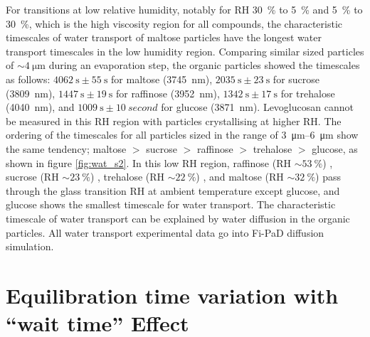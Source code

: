 For transitions at low relative humidity, notably for RH \SI{30}{\percent} to \SI{5}{\percent} and \SI{5}{\percent} to \SI{30}{\percent}, which is the high viscosity region for all compounds, the characteristic timescales of water transport of maltose particles have the longest water transport timescales in the low humidity region. Comparing similar sized particles of $\sim \SI{4}{\micro\meter}$ during an evaporation step, the organic particles showed the timescales as follows: $\SI{4062}{\second} \pm \SI{55}{\second}$ for maltose (\SI{3745}{\nano\meter}), $\SI{2035}{\second} \pm \SI{23}{\second}$ for sucrose (\SI{3809}{\nano\meter}), $\SI{1447}{\second} \pm \SI{19}{\second}$ for raffinose (\SI{3952}{\nano\meter}), $\SI{1342}{\second} \pm \SI{17}{\second}$ for trehalose (\SI{4040}{\nano\meter}), and $\SI{1009}{\second} \pm \SI{10}{second}$ for glucose (\SI{3871}{\nano\meter}). Levoglucosan cannot be measured in this RH region with particles crystallising at higher RH. The ordering of the timescales for all particles sized in the range of \SIrange[range-phrase=\text{--}]{3}{6}{\micro\meter} show the same tendency; maltose $>$ sucrose $>$ raffinose $>$ trehalose $>$ glucose, as shown in figure \ref{fig:wat_s2}. In this low RH region, raffinose (RH $\sim \SI{53}{\percent}$) \cite{Song2016a,Tong2011}, sucrose (RH $\sim \SI{23}{\percent}$) \cite{Song2016a,Tong2011}, trehalose (RH $\sim \SI{22}{\percent}$) \cite{Song2016a,chenLiteratureReviewSupplemented2000}, and maltose (RH $\sim \SI{32}{\percent}$) \cite{Song2016a,fosterGlassTransitionRelated2006} pass through the glass transition RH at ambient temperature except glucose, and glucose shows the smallest timescale for water transport. The characteristic timescale of water transport can be explained by water diffusion in the organic particles. All water transport experimental data go into Fi-PaD diffusion simulation.


\clearpage

\section{Equilibration time variation with ``wait time'' Effect}

